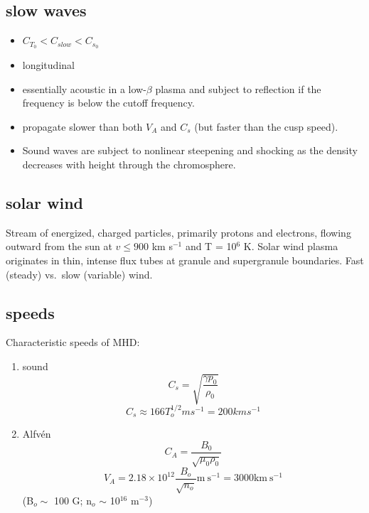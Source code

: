 \documentclass{article}
\begin{document}
\subsection{slow waves}
\begin{itemize}
    \item $C_{T_0} < C_{slow} < C_{s_0}$
    \item longitudinal
    \item essentially acoustic in a low-$\beta$ plasma and subject to
        reflection if the frequency is below the cutoff frequency.
    \item propagate slower than both $V_A$ and $C_s$ (but faster than
        the cusp speed).
    \item Sound waves are subject to nonlinear steepening and shocking
        as the density decreases with height through the chromosphere.
\end{itemize}

\subsection{solar wind}
Stream of energized, charged particles, primarily protons and electrons,
flowing outward from the sun at $v \leq 900$ km s$^{-1}$ and T = 10$^6$ K.
Solar wind plasma originates in thin, intense flux tubes at granule
and supergranule boundaries. Fast (steady) vs.\ slow (variable) wind.

\subsection{speeds}
Characteristic speeds of MHD:
\begin{enumerate}
    \item sound
        $$ C_s = \sqrt{\frac{\gamma p_0}{\rho_0}} $$
        $$ C_s \approx 166 T_o^{1/2} m s^{-1} = 200 km s^{-1}$$
    \item Alfv\'en
        $$ C_A = \frac{B_0}{\sqrt{\mu_0\rho_0}} $$
        $$ V_A = 2.18\times10^{12}\frac{B_o}{\sqrt{n_o}}
        \textrm{m}\ \textrm{s}^{-1}
               = 3000 \textrm{km}\ \textrm{s}^{-1} $$
               (B$_o \sim$ 100 G; n$_o$ $\sim$ 10$^{16}$ m$^{-3}$)
\end{enumerate}
\end{document}
